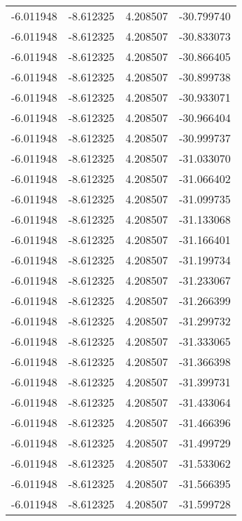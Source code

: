 \begin{tabular}{rrrr}
       -6.011948 &        -8.612325 &    4.208507 & -30.799740 \\
       -6.011948 &        -8.612325 &    4.208507 & -30.833073 \\
       -6.011948 &        -8.612325 &    4.208507 & -30.866405 \\
       -6.011948 &        -8.612325 &    4.208507 & -30.899738 \\
       -6.011948 &        -8.612325 &    4.208507 & -30.933071 \\
       -6.011948 &        -8.612325 &    4.208507 & -30.966404 \\
       -6.011948 &        -8.612325 &    4.208507 & -30.999737 \\
       -6.011948 &        -8.612325 &    4.208507 & -31.033070 \\
       -6.011948 &        -8.612325 &    4.208507 & -31.066402 \\
       -6.011948 &        -8.612325 &    4.208507 & -31.099735 \\
       -6.011948 &        -8.612325 &    4.208507 & -31.133068 \\
       -6.011948 &        -8.612325 &    4.208507 & -31.166401 \\
       -6.011948 &        -8.612325 &    4.208507 & -31.199734 \\
       -6.011948 &        -8.612325 &    4.208507 & -31.233067 \\
       -6.011948 &        -8.612325 &    4.208507 & -31.266399 \\
       -6.011948 &        -8.612325 &    4.208507 & -31.299732 \\
       -6.011948 &        -8.612325 &    4.208507 & -31.333065 \\
       -6.011948 &        -8.612325 &    4.208507 & -31.366398 \\
       -6.011948 &        -8.612325 &    4.208507 & -31.399731 \\
       -6.011948 &        -8.612325 &    4.208507 & -31.433064 \\
       -6.011948 &        -8.612325 &    4.208507 & -31.466396 \\
       -6.011948 &        -8.612325 &    4.208507 & -31.499729 \\
       -6.011948 &        -8.612325 &    4.208507 & -31.533062 \\
       -6.011948 &        -8.612325 &    4.208507 & -31.566395 \\
       -6.011948 &        -8.612325 &    4.208507 & -31.599728 \\

\end{tabular}
